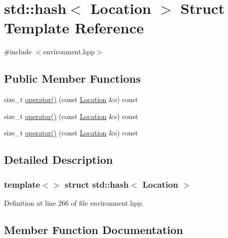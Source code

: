 \hypertarget{structstd_1_1hash_3_01_location_01_4}{}\section{std\+:\+:hash$<$ Location $>$ Struct Template Reference}
\label{structstd_1_1hash_3_01_location_01_4}


{\ttfamily \#include $<$environment.\+hpp$>$}

\subsection*{Public Member Functions}
\begin{DoxyCompactItemize}
\item 
size\+\_\+t \hyperlink{structstd_1_1hash_3_01_location_01_4_a51d2a62300e726c24c2372482698a89b}{operator()} (const \hyperlink{structlib_multi_robot_planning_1_1_location}{Location} \&s) const
\item 
size\+\_\+t \hyperlink{structstd_1_1hash_3_01_location_01_4_a51d2a62300e726c24c2372482698a89b}{operator()} (const \hyperlink{struct_location}{Location} \&s) const
\item 
size\+\_\+t \hyperlink{structstd_1_1hash_3_01_location_01_4_a51d2a62300e726c24c2372482698a89b}{operator()} (const \hyperlink{struct_location}{Location} \&s) const
\end{DoxyCompactItemize}


\subsection{Detailed Description}
\subsubsection*{template$<$$>$\newline
struct std\+::hash$<$ Location $>$}



Definition at line 266 of file environment.\+hpp.



\subsection{Member Function Documentation}
\mbox{\label{structstd_1_1hash_3_01_location_01_4_a51d2a62300e726c24c2372482698a89b}} 
